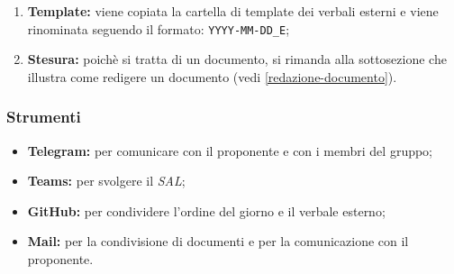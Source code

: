 \begin{itemize}
\begin{enumerate}
		      \item \textbf{Template:} viene copiata la cartella di template dei
		            verbali esterni e viene rinominata seguendo il formato:
		            \texttt{YYYY-MM-DD\_E};

		      \item \textbf{Stesura:} poichè si tratta di un documento, si
		            rimanda alla sottosezione che illustra come redigere un
		            documento (vedi \cref{redazione-documento}).
	      \end{enumerate}
\end{itemize}

\subsubsection{Strumenti}
\begin{itemize}
	\item \textbf{Telegram\g:} per comunicare con il proponente e con i membri del
	      gruppo;

	\item \textbf{Teams:} per svolgere il \textit{SAL};

	\item \textbf{GitHub\g:} per condividere l'ordine del giorno e il verbale
	      esterno;

	\item \textbf{Mail:} per la condivisione di documenti e per la
	      comunicazione con il proponente.
\end{itemize}
